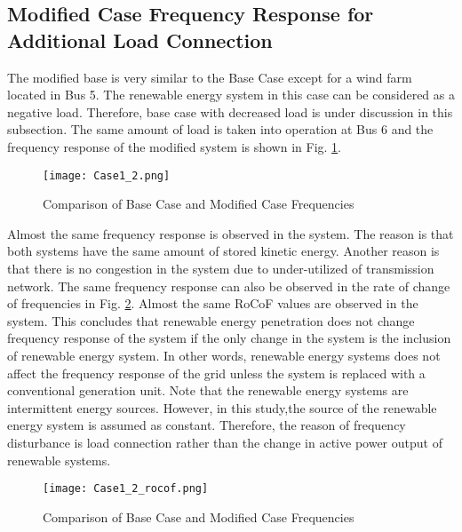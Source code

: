 \subsection{Modified Case Frequency Response for Additional Load Connection}
The modified base is very similar to the Base Case except for a wind farm located in Bus 5. The renewable energy system in this case can be considered as a negative load. Therefore, base case with decreased load is under discussion in this subsection. The same amount of load is taken into operation at Bus 6 and the frequency response of the modified system is shown in Fig. \ref{Case1_2_freq}. \par
\begin{figure}[h!]
	\centering
	\texttt{[image: Case1\_2.png]}
	\caption{Comparison of Base Case and Modified Case Frequencies}
	\label{Case1_2_freq}
\end{figure}
Almost the same frequency response is observed in the system. The reason is that both systems have the same amount of stored kinetic energy. Another reason is that there is no congestion in the system due to under-utilized of transmission network. The same frequency response can also be observed in the rate of change of frequencies in Fig. \ref{Case1_2_rocof}. Almost the same RoCoF values are observed in the system. This concludes that renewable energy penetration does not change frequency response of the system if the only change in the system is the inclusion of renewable energy system. In other words, renewable energy systems does not affect the frequency response of the grid unless the system is replaced with a conventional generation unit. Note that the renewable energy systems are intermittent energy sources. However, in this study,the source of the renewable energy system is assumed as constant. Therefore, the reason of frequency disturbance is load connection rather than the change in active power output of renewable systems.
\begin{figure}[h!]
	\centering
	\texttt{[image: Case1\_2\_rocof.png]}
	\caption{Comparison of Base Case and Modified Case Frequencies}
	\label{Case1_2_rocof}
\end{figure}
